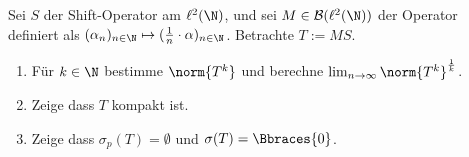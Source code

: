 \begin{exercise}[24/1$^\ast$]

Sei $S$ der Shift-Operator am $\ell^2(\N)$, und sei $M \in \mathcal{B}(\ell^2(\N))$ der Operator definiert als $(\alpha_n)_{n \in \N} \mapsto (\frac{1}{n} \cdot \alpha)_{n \in \N}$.
Betrachte $T := M S$.

\begin{enumerate}[label = (\alph*)]

  \item
  Für $k \in \N$ bestimme $\norm{T^k}$ und berechne $\lim_{n \to \infty} \norm{T^k}^\frac{1}{k}$.

  \item
  Zeige dass $T$ kompakt ist.

  \item
  Zeige dass $\sigma_p(T) = \emptyset$ und $\sigma(T) = \Bbraces{0}$.

\end{enumerate}

\end{exercise}

